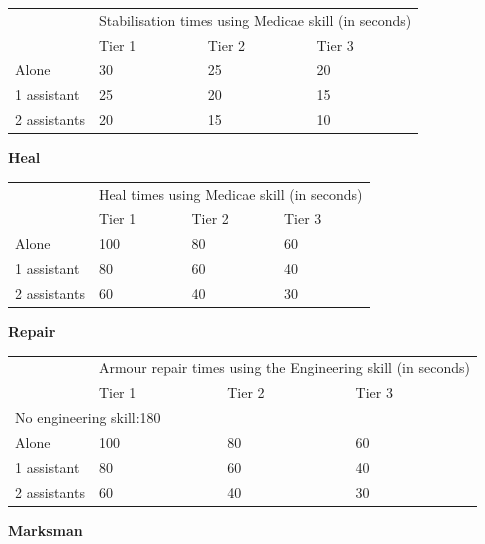 \begin{table}
\begin{tabular}{|l|l|l|l|} \hline 
\multirow{1}{*}{}& \multicolumn{3}{|l|}{Stabilisation times using Medicae skill (in seconds)} \\
\cline{2-2}\cline{3-3}\cline{4-4} & Tier 1 & Tier 2 & Tier 3 \\
 \hline Alone & 30 & 25 & 20 \\
 \hline 1 assistant & 25 & 20 & 15 \\
 \hline 2 assistants & 20 & 15 & 10 \\
 \hline \end{tabular}

\end{table}

\textbf{Heal}

\begin{table}
\begin{tabular}{|l|l|l|l|} \hline 
\multirow{1}{*}{}& \multicolumn{3}{|l|}{Heal times using Medicae skill (in seconds)} \\
\cline{2-2}\cline{3-3}\cline{4-4} & Tier 1 & Tier 2 & Tier 3 \\
 \hline Alone & 100 & 80 & 60 \\
 \hline 1 assistant & 80 & 60 & 40 \\
 \hline 2 assistants & 60 & 40 & 30 \\
 \hline \end{tabular}

\end{table}

\textbf{Repair}

\begin{table}
\begin{tabular}{|l|l|l|l|} \hline 
\multirow{1}{*}{}& \multicolumn{3}{|l|}{Armour repair times using the Engineering skill (in seconds)} \\
\cline{2-2}\cline{3-3}\cline{4-4} & Tier 1 & Tier 2 & Tier 3 \\
 \hline \multicolumn{4}{|l|}{No engineering skill:180} \\
 \hline Alone & 100 & 80 & 60 \\
 \hline 1 assistant & 80 & 60 & 40 \\
 \hline 2 assistants & 60 & 40 & 30 \\
 \hline \end{tabular}

\end{table}

\textbf{Marksman}

